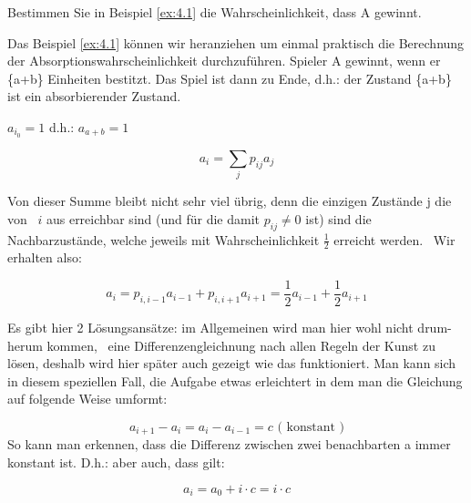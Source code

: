 \begin{uebsp}
\begin{Exercise}[label=ex:4.3]
Bestimmen Sie in Beispiel \ref{ex:4.1} die Wahrscheinlichkeit, dass A gewinnt.
\end{Exercise}
\begin{Answer}
Das Beispiel \ref{ex:4.1} k\"onnen wir heranziehen um einmal praktisch die
Berechnung der Absorptionswahrscheinlichkeit durchzuf\"uhren. Spieler A
gewinnt, wenn er \{a+b\} Einheiten bestitzt. Das Spiel ist dann zu
Ende, d.h.: der Zustand \{a+b\} ist ein absorbierender Zustand.

$a_{i_{0}}=1$  d.h.:  $a_{a+b}=1$

\begin{equation*}
a_{i}=\sum _{j}p_{\mathit{ij}}a_{j}
\end{equation*}


{
Von dieser Summe bleibt nicht sehr viel \"ubrig, denn die einzigen
Zust\"ande j die von \  $i$ aus erreichbar sind (und f\"ur die damit 
$p_{\mathit{ij}}\neq 0$ ist) sind die Nachbarzust\"ande, welche jeweils
mit Wahrscheinlichkeit  $\frac{1}{2}$ erreicht werden. \ Wir erhalten
also:}



\begin{equation*}
a_{i}=p_{i,i-1}a_{i-1}+p_{i,i+1}a_{i+1}=\frac{1}{2}a_{i-1}+\frac{1}{2}a_{i+1}
\end{equation*}


{
Es gibt hier 2 L\"osungsans\"atze: im Allgemeinen wird man hier wohl
nicht drum-herum kommen, \ eine Differenzengleichnung nach allen Regeln
der Kunst zu l\"osen, deshalb wird hier sp\"ater auch gezeigt wie das
funktioniert. Man kann sich in diesem speziellen Fall, die Aufgabe
etwas erleichtert in dem man die Gleichung auf folgende Weise umformt:}



\begin{equation*}
a_{i+1}-a_{i}=a_{i}-a_{i-1}=c\text{ ( konstant )}
\end{equation*}
{
So kann man erkennen, dass die Differenz zwischen zwei benachbarten a
immer konstant ist. D.h.: aber auch, dass gilt:}



\begin{equation*}
a_{i}=a_{0}+i\cdot c=i\cdot c
\end{equation*}


\end{Answer}
\end{uebsp}
